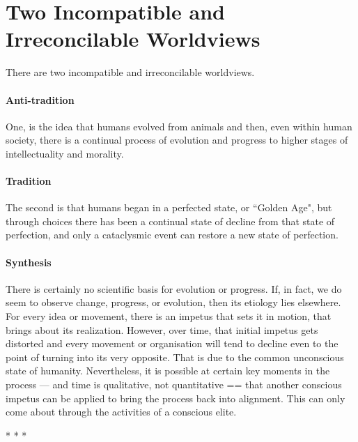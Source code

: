 \section{Two Incompatible and Irreconcilable Worldviews}

There are two incompatible and irreconcilable worldviews.

\paragraph{Anti-tradition}
One, is the idea that humans evolved from animals and then, even within human society, there is a continual process of evolution and progress to higher stages of intellectuality and morality.

\paragraph{Tradition}
The second is that humans began in a perfected state, or ``Golden Age", but through choices there has been a continual state of decline from that state of perfection, and only a cataclysmic event can restore a new state of perfection.

\paragraph{Synthesis}
There is certainly no scientific basis for evolution or progress. If, in fact, we do seem to observe change, progress, or evolution, then its etiology lies elsewhere. For every idea or movement, there is an impetus that sets it in motion, that brings about its realization. However, over time, that initial impetus gets distorted and every movement or organisation will tend to decline even to the point of turning into its very opposite. That is due to the common unconscious state of humanity. Nevertheless, it is possible at certain key moments in the process — and time is qualitative, not quantitative == that another conscious impetus can be applied to bring the process back into alignment. This can only come about through the activities of a conscious elite.




\begin{center}* * *\end{center}

